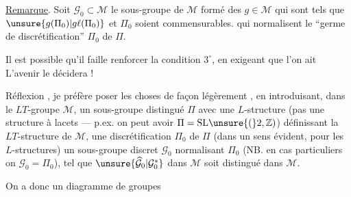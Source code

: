 \uline{Remarque}. Soit \(\mathcal{G}_0\subset\mathcal{M}\) le sous-groupe de \(\mathcal{M}\) formé des \(g\in\mathcal{M}\) qui sont tels que \(\unsure{g(\Pi_0)|g\ell(\Pi_0)}\) et \(\Pi_0\) soient commensurables.   qui normalisent le ``germe de discrétification'' \(\Pi_0\) de \(\Pi\).


Il est possible qu'il faille renforcer la condition \(3^\circ\), en exigeant que l'on ait
L'avenir le décidera !

Réflexion , je préfère poser les choses de façon légèrement , en introduisant, dans le \(LT\)-groupe  \(\mathcal{M}\), un sous-groupe  distingué \(\Pi\) avec une \(L\)-structure (pas  une structure à lacets --- p.ex. on peut avoir \(\Pi=\mathrm{SL}\unsure{(}2,\mathbb{Z})\)) définissant la \(LT\)-structure de \(\mathcal{M}\), une discrétification \(\Pi_0\) de \(\Pi\) (dans un sens évident, pour les \(L\)-structures) un sous-groupe discret \(\mathcal{G}_0\)  normalisant \(\Pi_0\) (NB. en cas particuliers  on \(\mathcal{G}_0=\Pi_0\)), tel que  \(\unsure{\widehat{\mathcal{G}}_0|\mathcal{G}_0^{*}}\)  dans \(\mathcal{M}\) soit distingué dans \(\mathcal{M}\).

On a donc un diagramme de groupes

